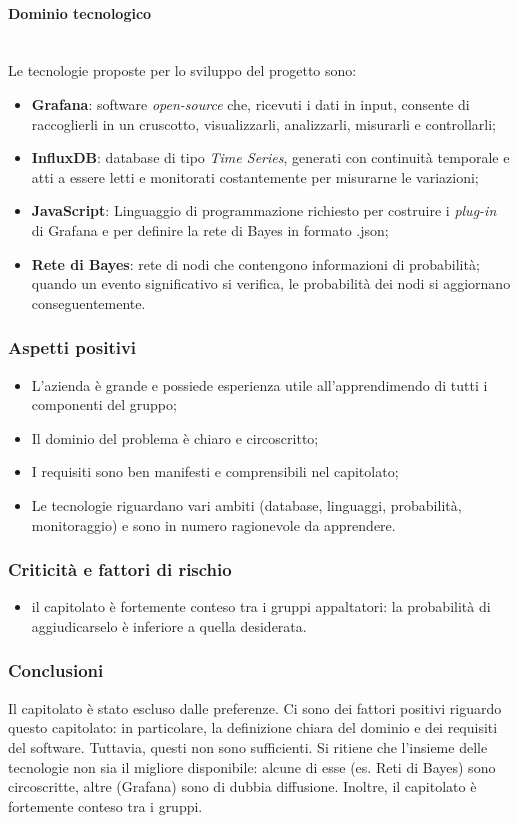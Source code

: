 \paragraph {Dominio tecnologico} \mbox{} \\
Le tecnologie proposte per lo sviluppo del progetto sono:
\begin{itemize}
	\item \textbf{Grafana}: software \textit{open-source} che, ricevuti i dati in input, consente di raccoglierli in un cruscotto, visualizzarli, analizzarli, misurarli e controllarli;
	\item \textbf{InfluxDB}: database di tipo \textit{Time Series}, generati con continuità temporale e atti a essere letti e monitorati costantemente per misurarne le variazioni;
	\item \textbf{JavaScript}: Linguaggio di programmazione richiesto per costruire i \textit{plug-in} di Grafana e per definire la rete di Bayes in formato .json;
	\item \textbf{Rete di Bayes}: rete di nodi che contengono informazioni di probabilità; quando un evento significativo si verifica, le probabilità dei nodi si aggiornano conseguentemente.
\end{itemize}
\subsubsection{Aspetti positivi}
\begin{itemize}
	\item L'azienda è grande e possiede esperienza utile all'apprendimendo di tutti i componenti del gruppo;
	\item Il dominio del problema è chiaro e circoscritto;
	\item I requisiti sono ben manifesti e comprensibili nel capitolato;
	\item Le tecnologie riguardano vari ambiti (database, linguaggi, probabilità, monitoraggio) e sono in numero ragionevole da apprendere.
\end{itemize}
\subsubsection{Criticità e fattori di rischio}
\begin{itemize}
	\item il capitolato è fortemente conteso tra i gruppi appaltatori: la probabilità di aggiudicarselo è inferiore a quella desiderata.
\end{itemize}
\subsubsection{Conclusioni}
Il capitolato è stato escluso dalle preferenze. Ci sono dei fattori positivi riguardo questo capitolato: in particolare, la definizione chiara del dominio e dei requisiti del software. Tuttavia, questi non sono sufficienti. Si ritiene che l'insieme delle tecnologie non sia il migliore disponibile: alcune di esse (es. Reti di Bayes) sono circoscritte, altre (Grafana) sono di dubbia diffusione. Inoltre, il capitolato è fortemente conteso tra i gruppi. 